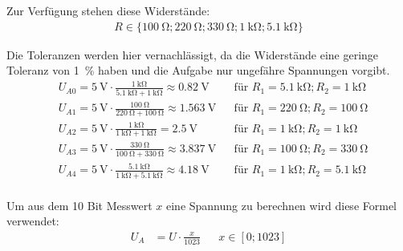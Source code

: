 \documentclass{article}
\begin{document}
Zur Verfügung stehen diese Widerstände:
\begin{align*}
    R \in \{\SI{100}{\ohm}; \SI{220}{\ohm}; \SI{330}{\ohm}; \SI{1}{\kilo\ohm}; \SI{5.1}{\kilo\ohm}\}
\end{align*}

Die Toleranzen werden hier vernachlässigt, da die Widerstände eine geringe Toleranz von \SI{1}{\percent} haben 
und die Aufgabe nur ungefähre Spannungen vorgibt.
\begin{align*}
   &U_{A0} = \SI{5}{\volt} \cdot \frac{\SI{1}{\kilo\ohm}}{\SI{5.1}{\kilo\ohm} + \SI{1}{\kilo\ohm}} \approx \SI{0.82}{\volt}
   &&\text{für } R_1 = \SI{5.1}{\kilo\ohm}; R_2 = \SI{1}{\kilo\ohm}\\
   &U_{A1} = \SI{5}{\volt} \cdot \frac{\SI{100}{\ohm}}{\SI{220}{\ohm} + \SI{100}{\ohm}} \approx \SI{1.563}{\volt}
   &&\text{für } R_1 = \SI{220}{\ohm}; R_2 = \SI{100}{\ohm}\\
   &U_{A2} = \SI{5}{\volt} \cdot \frac{\SI{1}{\kilo\ohm}}{\SI{1}{\kilo\ohm} + \SI{1}{\kilo\ohm}} = \SI{2.5}{\volt}
   &&\text{für } R_1 = \SI{1}{\kilo\ohm}; R_2 = \SI{1}{\kilo\ohm}\\
   &U_{A3} = \SI{5}{\volt} \cdot \frac{\SI{330}{\ohm}}{\SI{100}{\ohm} + \SI{330}{\ohm}} \approx \SI{3.837}{\volt}
   &&\text{für } R_1 = \SI{100}{\ohm}; R_2 = \SI{330}{\ohm}\\
   &U_{A4} = \SI{5}{\volt} \cdot \frac{\SI{5.1}{\kilo\ohm}}{\SI{1}{\kilo\ohm} + \SI{5.1}{\kilo\ohm}} \approx \SI{4.18}{\volt}
   &&\text{für } R_1 = \SI{1}{\kilo\ohm}; R_2 = \SI{5.1}{\kilo\ohm}\\
\end{align*}

Um aus dem 10 Bit Messwert $x$ eine Spannung zu berechnen wird diese Formel verwendet:
\begin{align*}
    U_A &= U \cdot \frac{x}{1023}
    &&x \in [0; 1023]
\end{align*}

\clearpage

\end{document}
